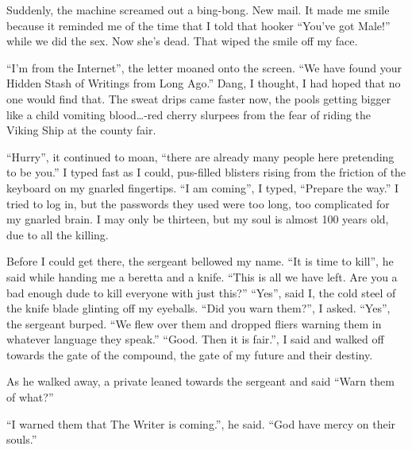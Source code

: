 Suddenly, the machine screamed out a bing-bong. New mail. It made
me smile because it reminded me of the time that I told that hooker
``You've got Male!'' while we did the sex. Now she's dead. That wiped
the smile off my face.



``I'm from the Internet'', the letter moaned onto the screen. ``We
have found your Hidden Stash of Writings from Long Ago.'' Dang, I
thought, I had hoped that no one would find that. The sweat drips
came faster now, the pools getting bigger like a child vomiting
blood{\ldots}-red cherry slurpees from the fear of riding the Viking
Ship at the county fair.



``Hurry'', it continued to moan, ``there are already many people here
pretending to be you.'' I typed fast as I could, pus-filled blisters
rising from the friction of the keyboard on my gnarled fingertips.
``I am coming'', I typed, ``Prepare the way.'' I tried to log in, but
the passwords they used were too long, too complicated for my
gnarled brain. I may only be thirteen, but my soul is almost 100
years old, due to all the killing.



Before I could get there, the sergeant bellowed my name. ``It is
time to kill'', he said while handing me a beretta and a knife.
``This is all we have left. Are you a bad enough dude to kill
everyone with just this?'' ``Yes'', said I, the cold steel of the
knife blade glinting off my eyeballs. ``Did you warn them?'', I
asked. ``Yes'', the sergeant burped. ``We flew over them and dropped
fliers warning them in whatever language they speak.'' ``Good. Then
it is fair.'', I said and walked off towards the gate of the
compound, the gate of my future and their destiny.



As he walked away, a private leaned towards the sergeant and said
``Warn them of what?''



``I warned them that The Writer is coming.'', he said. ``God have
mercy on their souls.'' 
 



%
%
%
%
%
%
%
%
% 
%

